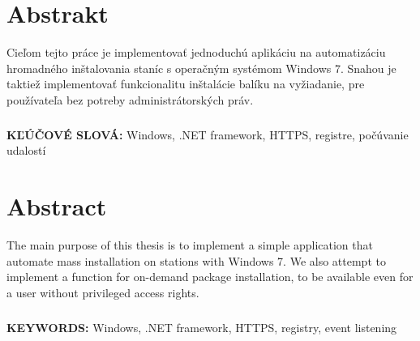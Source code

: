 \chapter*{Abstrakt}
Cieľom tejto práce je implementovať jednoduchú aplikáciu na automatizáciu hromadného inštalovania staníc s operačným systémom Windows 7. Snahou je taktiež implementovať funkcionalitu inštalácie balíku na vyžiadanie, pre používateľa bez  potreby administrátorských práv. 

\paragraph{}
\textbf{KĽÚČOVÉ SLOVÁ:} Windows, .NET framework, HTTPS, registre, počúvanie udalostí

\newpage
\chapter*{Abstract}
The main purpose of this thesis is to implement a simple application that automate mass installation on stations with Windows 7. We also attempt to implement a function for on-demand package installation, to be available even for a user without privileged access rights.

\paragraph{}
\textbf{KEYWORDS:} Windows, .NET framework, HTTPS, registry, event listening